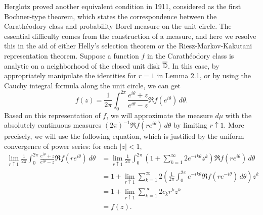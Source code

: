 \documentclass[12pt]{article}
\begin{document}
Herglotz proved another equivalent condition in 1911, considered as the first Bochner-type theorem, which states the correspondence between the Carath\'eodory class and probability Borel measure on the unit circle.
The essential difficulty comes from the construction of a measure, and here we resolve this in the aid of either Helly's selection theorem or the Riesz-Markov-Kakutani representation theorem.
Suppose a function $f$ in the Carath\'eodory class is analytic on a neighborhood of the closed unit disk $\overline{\mathbb{D}}$.
In this case, by appropriately manipulate the identities for $r=1$ in Lemma 2.1, or by using the Cauchy integral formula along the unit circle, we can get
\[f(z)=\frac1{2\pi}\int_0^{2\pi}\frac{e^{i\theta}+z}{e^{i\theta}-z}\Re f(e^{i\theta})\,d\theta.\]
Based on this representation of $f$, we will approximate the measure $d\mu$ with the absolutely continuous measures $(2\pi)^{-1}\Re f(re^{i\theta})\,d\theta$ by limiting $r\uparrow1$.
More precisely, we will use the following equation, which is justified by the uniform convergence of power series: for each $|z|<1$,
\begin{align*}
\lim_{r\uparrow1}\frac1{2\pi}\int_0^{2\pi}\frac{e^{i\theta}+z}{e^{i\theta}-z}\Re f(re^{i\theta})\,d\theta
&=\lim_{r\uparrow1}\frac1{2\pi}\int_0^{2\pi}\left(1+\sum_{k=1}^\infty2e^{-ik\theta}z^k\right)\Re f(re^{i\theta})\,d\theta\\
&=1+\lim_{r\uparrow1}\sum_{k=1}^\infty2\left(\frac1{2\pi}\int_0^{2\pi}e^{-ik\theta}\Re f(re^{-i\theta})\,d\theta\right)z^k\\
&=1+\lim_{r\uparrow1}\sum_{k=1}^\infty2c_kr^kz^k\\
&=f(z).
\end{align*}
\end{document}
